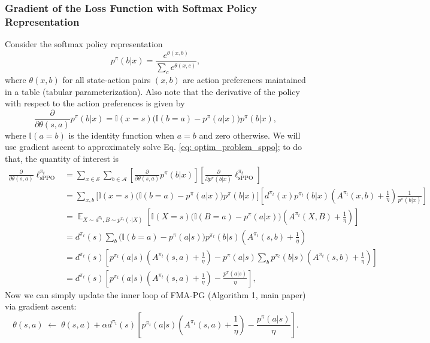 \documentclass[a4paper, 10pt]{article}
\DeclareMathOperator{\E}{\mathbb{E}}
\begin{document}
\subsubsection{Gradient of the Loss Function with Softmax Policy Representation}
Consider the softmax policy representation
\begin{equation}
  p^\pi(b | x) = \frac{e^{\theta(x, b)}}{\sum_c e^{\theta(x, c)}}, \label{eq: softmax}
\end{equation}
where $\theta(x, b)$ for all state-action pairs $(x, b)$ are action preferences maintained in a table (tabular parameterization). Also note that the derivative of the policy with respect to the action preferences is given by
\begin{equation}
  \frac{\partial}{\partial \theta(s, a)} p^\pi(b | x) = \mathbb{I}(x = s) \Big( \mathbb{I}(b = a) - p^\pi(a | x) \Big) p^\pi(b | x),
\end{equation}
where $\mathbb{I}(a = b)$ is the identity function when $a = b$ and zero otherwise. 
We will use gradient ascent to approximately solve Eq. \ref{eq: optim_problem_sppo}; to do that, the quantity of interest is
\begin{align}
  \frac{\partial}{\partial \theta(s, a)} \ell^{\pi_t}_{\text{sPPO}} &= \sum_{x \in \mathcal{S}} \sum_{b \in \mathcal{A}} \left[ \frac{\partial}{\partial \theta(s, a)} p^\pi(b | x) \right] \left[ \frac{\partial}{\partial p^\pi(b | x)} \ell^{\pi_t}_{\text{sPPO}} \right] \tag*{(using total derivative)} \\
  &= \sum_{x, b} \Big[ \mathbb{I}(x = s) \Big( \mathbb{I}(b = a) - p^\pi(a | x) \Big) p^\pi(b | x) \Big] \left[ d^{\pi_t}(x) p^{\pi_t}(b|x) \left( A^{\pi_t}(x, b) + \frac{1}{\eta} \right) \frac{1}{p^\pi(b|x)} \right] \nonumber \\
  &= \E_{X \sim d^{\pi_t}, B \sim p^{\pi_t}(\cdot | X)} \left[ \mathbb{I}(X = s) \Big( \mathbb{I}(B = a) - p^\pi(a | x) \Big) \left( A^{\pi_t}(X, B) + \frac{1}{\eta} \right) \right] \\
  &= d^{\pi_t}(s) \sum_b \Big( \mathbb{I}(b = a) - p^\pi(a | s) \Big) p^{\pi_t}(b|s) \left( A^{\pi_t}(s, b) + \frac{1}{\eta} \right) \nonumber \\
  &= d^{\pi_t}(s) \left[ p^{\pi_t}(a|s) \left( A^{\pi_t}(s, a) + \frac{1}{\eta} \right) - p^\pi(a | s) \sum_b p^{\pi_t}(b|s) \left(A^{\pi_t}(s, b) + \frac{1}{\eta} \right) \right] \nonumber \\
  &= d^{\pi_t}(s) \left[ p^{\pi_t}(a|s) \left( A^{\pi_t}(s, a) + \frac{1}{\eta} \right) - \frac{p^\pi(a | s)}{\eta} \right], \nonumber
\end{align}
Now we can simply update the inner loop of FMA-PG (Algorithm 1, main paper) via gradient ascent:
\begin{equation}
  \theta(s, a) \; \leftarrow \; \theta(s, a) + \alpha d^{\pi_t}(s) \left[ p^{\pi_t}(a|s) \left( A^{\pi_t}(s, a) + \frac{1}{\eta} \right) - \frac{p^\pi(a | s)}{\eta} \right].
\end{equation}
\end{document}
